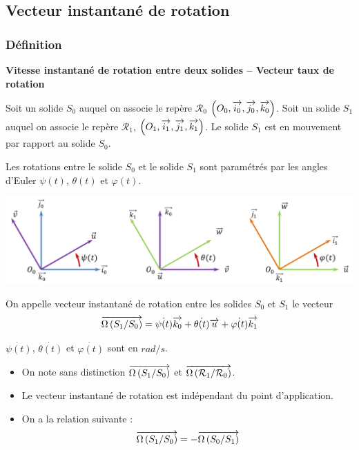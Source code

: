 \documentclass[10pt,oneside]{article}
\begin{document}
\subsection{Vecteur instantané de rotation}

\subsubsection{Définition}

\begin{defi}
\textbf{Vitesse instantané de rotation entre deux solides -- Vecteur taux de rotation}

Soit un solide $S_0$ auquel on associe le repère $\mathcal{R}_0$ $\left(O_0,\overrightarrow{i_0},\overrightarrow{j_0},\overrightarrow{k_0} \right)$.  Soit un solide $S_1$ auquel on associe le repère $\mathcal{R}_1$,  $\left(O_1,\overrightarrow{i_1},\overrightarrow{j_1},\overrightarrow{k_1} \right)$. Le solide $S_1$ est en mouvement par rapport au solide $S_0$. 


\begin{minipage}[c]{.3\linewidth} 
Les rotations entre le solide $S_0$ et le solide $S_1$ sont paramétrés par les angles d'Euler $\psi(t)$, $\theta(t)$ et $\varphi(t)$.
\end{minipage}\hfill
\begin{minipage}[c]{.65\linewidth}
\begin{center}
\includegraphics[width=\textwidth]{png/euler}
\end{center}
\end{minipage}

\vspace{.25cm}

On appelle vecteur instantané de rotation entre les solides $S_0$ et $S_1$ le vecteur
$$
\overrightarrow{\Omega\left( {S_1}/{S_0}\right)} = \dot{\psi(t)} \overrightarrow{k_0} + \dot{\theta(t)} \overrightarrow{u} + \dot{\varphi(t)} \overrightarrow{k_1}
$$

$\dot{\psi(t)} $, $\dot{\theta(t)} $ et $\dot{\varphi(t)} $ sont en $rad/s$. 
\end{defi}

\begin{rem}

\begin{itemize}
\item On note sans distinction $\overrightarrow{\Omega\left( {S_1}/{S_0}\right)}$ et $\overrightarrow{\Omega\left( {\mathcal{R}_1}/{\mathcal{R}_0}\right)}$.
\item Le vecteur instantané de rotation est indépendant du point d'application.
\item On a la relation suivante :
$$\overrightarrow{\Omega\left( {S_1}/{S_0}\right)} = -\overrightarrow{\Omega\left( {S_0}/{S_1}\right)}$$
\end{itemize}
\end{rem}
\end{document}

